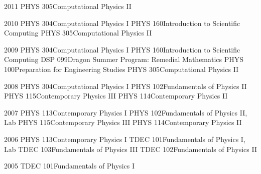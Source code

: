\documentclass[]{scrartcl}
\begin{document}
\begin{cleanCV}
\Teaching
{2011}
{PHYS 305}{Computational Physics II\TeachingNote}

\Teaching
{2010}
{PHYS 304}{Computational Physics I\TeachingNote}
\Teaching
{}
{PHYS 160}{Introduction to Scientific Computing\TeachingNote}
\Teaching
{}
{PHYS 305}{Computational Physics II\TeachingNote}

\Teaching
{2009}
{PHYS 304}{Computational Physics I\TeachingNote}
\Teaching
{}
{PHYS 160}{Introduction to Scientific Computing\TeachingNote}
\Teaching
{}
{DSP 099}{Dragon Summer Program: Remedial Mathematics}
\Teaching
{}
{PHYS 100}{Preparation for Engineering Studies}
\Teaching
{}
{PHYS 305}{Computational Physics II\TeachingNote}

\Teaching
{2008}
{PHYS 304}{Computational Physics I\TeachingNote}
\Teaching
{}
{PHYS 102}{Fundamentals of Physics II\TeachingNote}
\Teaching
{}
{PHYS 115}{Contemporary Physics III\TeachingNote}
\Teaching
{}
{PHYS 114}{Contemporary Physics II\TeachingNote}

\Teaching
{2007}
{PHYS 113}{Contemporary Physics I\TeachingNote}
\Teaching
{}
{PHYS 102}{Fundamentals of Physics II, Lab}
\Teaching
{}
{PHYS 115}{Contemporary Physics III\TeachingNote}
\Teaching
{}
{PHYS 114}{Contemporary Physics II\TeachingNote}

\Teaching
{2006}
{PHYS 113}{Contemporary Physics I\TeachingNote}
\Teaching
{}
{TDEC 101}{Fundamentals of Physics I, Lab}
\Teaching
{}
{TDEC 103}{Fundamentals of Physics III\TeachingNote}
\Teaching
{}
{TDEC 102}{Fundamentals of Physics II\TeachingNote}

\Teaching
{2005}
{TDEC 101}{Fundamentals of Physics I\TeachingNote}


\end{cleanCV}
\end{document}
